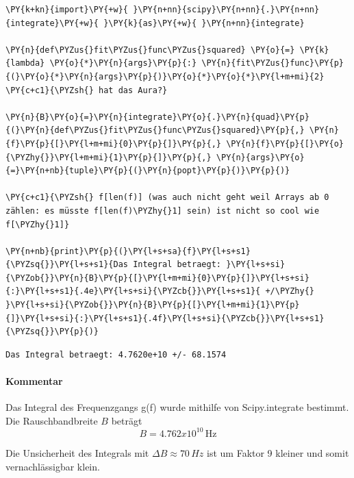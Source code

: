     \begin{tcolorbox}[breakable, size=fbox, boxrule=1pt, pad at break*=1mm,colback=cellbackground, colframe=cellborder]
\begin{Verbatim}[commandchars=\\\{\}]
\PY{k+kn}{import}\PY{+w}{ }\PY{n+nn}{scipy}\PY{n+nn}{.}\PY{n+nn}{integrate}\PY{+w}{ }\PY{k}{as}\PY{+w}{ }\PY{n+nn}{integrate}

\PY{n}{def\PYZus{}fit\PYZus{}func\PYZus{}squared} \PY{o}{=} \PY{k}{lambda} \PY{o}{*}\PY{n}{args}\PY{p}{:} \PY{n}{fit\PYZus{}func}\PY{p}{(}\PY{o}{*}\PY{n}{args}\PY{p}{)}\PY{o}{*}\PY{o}{*}\PY{l+m+mi}{2} \PY{c+c1}{\PYZsh{} hat das Aura?}

\PY{n}{B}\PY{o}{=}\PY{n}{integrate}\PY{o}{.}\PY{n}{quad}\PY{p}{(}\PY{n}{def\PYZus{}fit\PYZus{}func\PYZus{}squared}\PY{p}{,} \PY{n}{f}\PY{p}{[}\PY{l+m+mi}{0}\PY{p}{]}\PY{p}{,} \PY{n}{f}\PY{p}{[}\PY{o}{\PYZhy{}}\PY{l+m+mi}{1}\PY{p}{]}\PY{p}{,} \PY{n}{args}\PY{o}{=}\PY{n+nb}{tuple}\PY{p}{(}\PY{n}{popt}\PY{p}{)}\PY{p}{)}

\PY{c+c1}{\PYZsh{} f[len(f)] (was auch nicht geht weil Arrays ab 0 zählen: es müsste f[len(f)\PYZhy{}1] sein) ist nicht so cool wie f[\PYZhy{}1]}

\PY{n+nb}{print}\PY{p}{(}\PY{l+s+sa}{f}\PY{l+s+s1}{\PYZsq{}}\PY{l+s+s1}{Das Integral betraegt: }\PY{l+s+si}{\PYZob{}}\PY{n}{B}\PY{p}{[}\PY{l+m+mi}{0}\PY{p}{]}\PY{l+s+si}{:}\PY{l+s+s1}{.4e}\PY{l+s+si}{\PYZcb{}}\PY{l+s+s1}{ +/\PYZhy{} }\PY{l+s+si}{\PYZob{}}\PY{n}{B}\PY{p}{[}\PY{l+m+mi}{1}\PY{p}{]}\PY{l+s+si}{:}\PY{l+s+s1}{.4f}\PY{l+s+si}{\PYZcb{}}\PY{l+s+s1}{\PYZsq{}}\PY{p}{)}
\end{Verbatim}
\end{tcolorbox}

    \begin{Verbatim}[commandchars=\\\{\}]
Das Integral betraegt: 4.7620e+10 +/- 68.1574
    \end{Verbatim}

    \hypertarget{kommentar}{%
\paragraph{Kommentar}\label{kommentar}}

Das Integral des Frequenzgangs g(f) wurde mithilfe von Scipy.integrate
bestimmt. Die Rauschbandbreite \(B\) beträgt
\[B=4.762 x 10^{10} \,\text{Hz}\]

Die Unsicherheit des Integrals mit \(\Delta B \approx 70 \, Hz\) ist um
Faktor 9 kleiner und somit vernachlässigbar klein.

